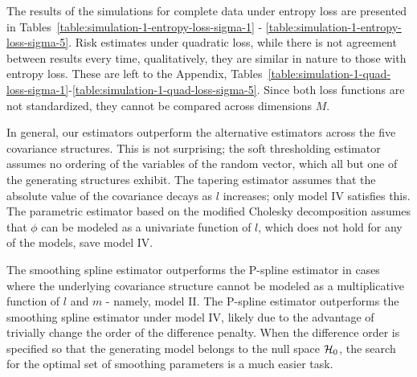 \bigskip
The results of the simulations for complete data under entropy loss are presented in Tables~\ref{table:simulation-1-entropy-loss-sigma-1} - \ref{table:simulation-1-entropy-loss-sigma-5}. Risk estimates under quadratic loss, while there is not agreement between results every time, qualitatively, they are similar in nature to those with entropy loss. These are left to the Appendix, Tables~\ref{table:simulation-1-quad-loss-sigma-1}-\ref{table:simulation-1-quad-loss-sigma-5}. Since both loss functions are not standardized, they cannot be compared across dimensions $M$.

\bigskip

In general, our estimators outperform the alternative estimators across the five covariance structures. This is not surprising; the soft thresholding estimator assumes no ordering of the variables of the random vector, which all but one of the generating structures exhibit. The tapering estimator assumes that the absolute value of the covariance decays as $l$ increases; only model IV satisfies this. The parametric estimator based on the modified Cholesky decomposition assumes that $\phi$ can be modeled as a univariate function of $l$, which does not hold for any of the models, save model IV.

\bigskip

The smoothing spline estimator outperforms the P-spline estimator in cases where the underlying covariance structure cannot be modeled as a multiplicative function of $l$ and $m$ - namely, model II. The P-spline estimator outperforms the smoothing spline estimator under model IV, likely due to the advantage of trivially change the order of the difference penalty. When the difference order is specified so that the generating model belongs to the null space $\mathcal{H}_0$, the search for the optimal set of smoothing parameters is a much easier task.   
 
